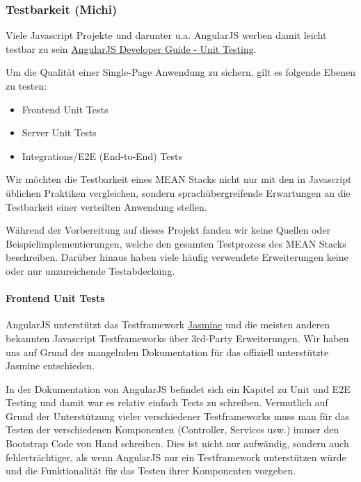 \subsubsection{Testbarkeit (Michi)}\label{testbarkeit-michi}

Viele Javascript Projekte und darunter u.a. AngularJS werben damit
leicht testbar zu sein
\href{https://docs.angularjs.org/guide/unit-testing}{AngularJS Developer
Guide - Unit Testing}.

Um die Qualität einer Single-Page Anwendung zu sichern, gilt es folgende
Ebenen zu testen:

\begin{itemize}
\itemsep1pt\parskip0pt
\item
  Frontend Unit Tests
\item
  Server Unit Tests
\item
  Integrations/E2E (End-to-End) Tests
\end{itemize}

Wir möchten die Testbarkeit eines MEAN Stacks nicht nur mit den in
Javascript üblichen Praktiken vergleichen, sondern sprachübergreifende
Erwartungen an die Testbarkeit einer verteilten Anwendung stellen.

Während der Vorbereitung auf dieses Projekt fanden wir keine Quellen
oder Beispielimplementierungen, welche den gesamten Testprozess des MEAN
Stacks beschreiben. Darüber hinaus haben viele häufig verwendete
Erweiterungen keine oder nur unzureichende Testabdeckung.

\paragraph{Frontend Unit Tests}\label{frontend-unit-tests}

AngularJS unterstützt das Testframework
\href{http://jasmine.github.io/}{Jasmine} und die meisten anderen
bekannten Javascript Testframeworks über 3rd-Party Erweiterungen. Wir
haben uns auf Grund der mangelnden Dokumentation für das offiziell
unterstützte Jasmine entschieden.

In der Dokumentation von AngularJS befindet sich ein Kapitel zu Unit und
E2E Testing und damit war es relativ einfach Tests zu schreiben.
Vermutlich auf Grund der Unterstützung vieler verschiedener
Testframeworks muss man für das Testen der verschiedenen Komponenten
(Controller, Services usw.) immer den Bootstrap Code von Hand schreiben.
Dies ist nicht nur aufwändig, sondern auch fehlerträchtiger, als wenn
AngularJS nur ein Testframework unterstützen würde und die
Funktionalität für das Testen ihrer Komponenten vorgeben.

